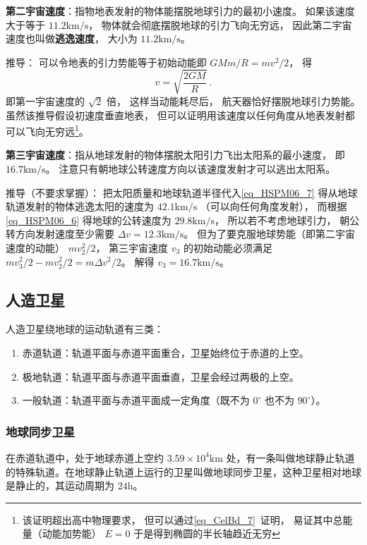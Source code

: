 \textbf{第二宇宙速度}：指物地表发射的物体能摆脱地球引力的最初小速度。 如果该速度大于等于 $11.2\mathrm{km/s}$， 物体就会彻底摆脱地球的引力飞向无穷远， 因此第二宇宙速度也叫做\textbf{逃逸速度}， 大小为 $11.2\mathrm{km/s}$。

推导： 可以令地表的引力势能等于初始动能即 $GMm/R = mv^2/2$， 得
\begin{equation}\label{eq_HSPM06_7}
v = \sqrt{\frac{2GM}{R}}~.
\end{equation}
即第一宇宙速度的 $\sqrt{2}$ 倍， 这样当动能耗尽后， 航天器恰好摆脱地球引力势能。 虽然该推导假设初速度垂直地表， 但可以证明用该速度以任何角度从地表发射都可以飞向无穷远\footnote{该证明超出高中物理要求， 但可以通过\autoref{eq_CelBd_7}~证明， 易证其中总能量（动能加势能） $E = 0$ 于是得到椭圆的半长轴趋近无穷}。

\textbf{第三宇宙速度}：指从地球发射的物体摆脱太阳引力飞出太阳系的最小速度， 即 $16.7\mathrm{km/s}$。 注意只有朝地球公转速度方向以该速度发射才可以逃出太阳系。

推导（不要求掌握）： 把太阳质量和地球轨道半径代入\autoref{eq_HSPM06_7} 得从地球轨道发射的物体逃逸太阳的速度为 $42.1\mathrm{km/s}$ （可以向任何角度发射）， 而根据\autoref{eq_HSPM06_6} 得地球的公转速度为 $29.8\mathrm{km/s}$， 所以若不考虑地球引力， 朝公转方向发射速度至少需要 $\Delta v = 12.3\mathrm{km/s}$。 但为了要克服地球势能（即第二宇宙速度的动能） $mv_2^2/2$， 第三宇宙速度 $v_3$ 的初始动能必须满足 $mv_3^2/2 - mv_2^2/2 = m\Delta v^2/2$。 解得 $v_3 = 16.7\mathrm{km/s}$。

\subsection{人造卫星}

人造卫星绕地球的运动轨道有三类：

\begin{enumerate}
\item 赤道轨道：轨道平面与赤道平面重合，卫星始终位于赤道的上空。
\item 极地轨道：轨道平面与赤道平面垂直，卫星会经过两极的上空。
\item 一般轨道：轨道平面与赤道平面成一定角度（既不为 $0^\circ$ 也不为 $90^\circ$）。
\end{enumerate}

\subsubsection{地球同步卫星}

在赤道轨道中，处于地球赤道上空约 $3.59\times10^4\mathrm{km}$ 处，有一条叫做地球静止轨道的特殊轨道。在地球静止轨道上运行的卫星叫做地球同步卫星，这种卫星相对地球是静止的，其运动周期为 $24\mathrm{h}$。

